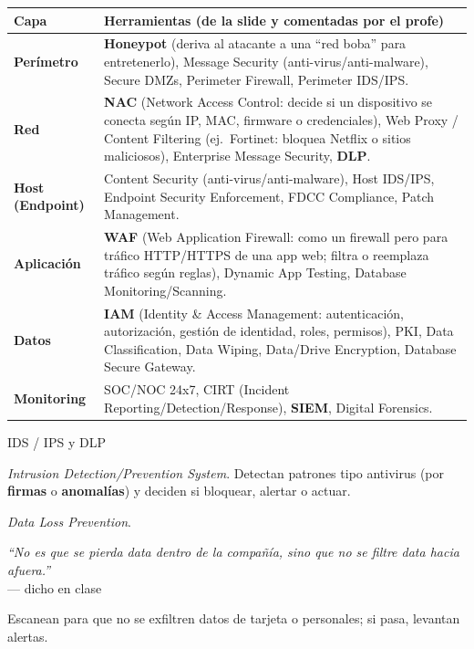 \documentclass[11pt,a4paper]{article}
\newcommand{\prof}[1]{\par\medskip\noindent\textit{``#1''}\\[-2pt]\hspace*{1em}%
  {\footnotesize\textcolor{black!60}{--- dicho en clase}}\par\medskip\noindent}
\begin{document}
\begin{center}
\begin{tabular}{@{}>{\bfseries}p{}p{}@{}}
\toprule
Capa & Herramientas (de la slide y comentadas por el profe) \\
\midrule
Perímetro & \textbf{Honeypot} (deriva al atacante a una ``red boba'' para entretenerlo),
            Message Security (anti-virus/anti-malware), Secure DMZs, Perimeter Firewall,
            Perimeter IDS/IPS. \\
Red & \textbf{NAC} (Network Access Control: decide si un dispositivo se conecta según IP, MAC,
       firmware o credenciales), Web Proxy / Content Filtering (ej.\ Fortinet: bloquea Netflix
       o sitios maliciosos), Enterprise Message Security, \textbf{DLP}. \\
Host (Endpoint) & Content Security (anti-virus/anti-malware), Host IDS/IPS, Endpoint Security
       Enforcement, FDCC Compliance, Patch Management. \\
Aplicación & \textbf{WAF} (Web Application Firewall: como un firewall pero para tráfico
       HTTP/HTTPS de una app web; filtra o reemplaza tráfico según reglas), Dynamic App
       Testing, Database Monitoring/Scanning. \\
Datos & \textbf{IAM} (Identity \& Access Management: autenticación, autorización, gestión de
       identidad, roles, permisos), PKI, Data Classification, Data Wiping, Data/Drive
       Encryption, Database Secure Gateway. \\
Monitoring & SOC/NOC 24x7, CIRT (Incident Reporting/Detection/Response), \textbf{SIEM}, Digital
       Forensics. \\
\bottomrule
\end{tabular}
\end{center}

\begin{defbox}{IDS / IPS y DLP}
\begin{description}[leftmargin=0pt,labelsep=0.4em,style=nextline,itemsep=2pt]
  \item[IDS / IPS] \emph{Intrusion Detection/Prevention System}. Detectan patrones tipo
        antivirus (por \textbf{firmas} o \textbf{anomalías}) y deciden si bloquear, alertar o
        actuar.
  \item[DLP] \emph{Data Loss Prevention}. \prof{No es que se pierda data dentro de la compañía,
        sino que no se filtre data hacia afuera.} Escanean para que no se exfiltren datos de
        tarjeta o personales; si pasa, levantan alertas.
\end{description}
\end{defbox}
\end{document}
